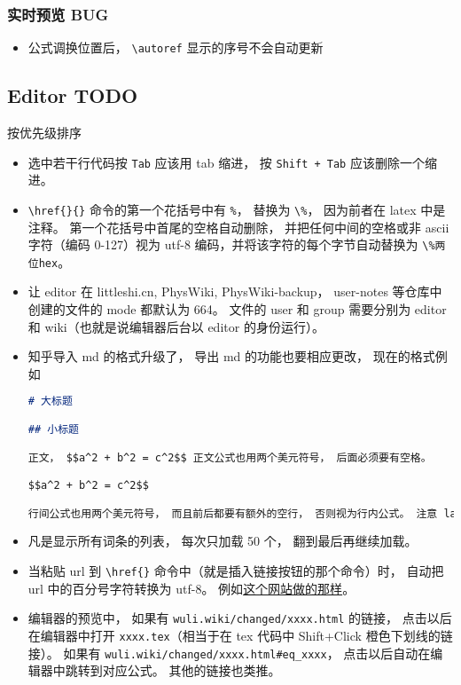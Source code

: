 \subsubsection{实时预览 BUG}
\begin{itemize}
\item 公式调换位置后， \verb|\autoref| 显示的序号不会自动更新
\end{itemize}

\subsection{Editor TODO}
按优先级排序
\begin{itemize}
\item 选中若干行代码按 \verb|Tab| 应该用 tab 缩进， 按 \verb|Shift + Tab| 应该删除一个缩进。
\item \verb|\href{}{}| 命令的第一个花括号中有 \verb|%|， 替换为 \verb|\%|， 因为前者在 latex 中是注释。 第一个花括号中首尾的空格自动删除， 并把任何中间的空格或非 ascii 字符（编码 0-127）视为 utf-8 编码，并将该字符的每个字节自动替换为 \verb|\%两位hex|。
\item 让 editor 在 littleshi.cn, PhysWiki, PhysWiki-backup， user-notes 等仓库中创建的文件的 mode 都默认为 664。 文件的 user 和 group 需要分别为 editor 和 wiki（也就是说编辑器后台以 editor 的身份运行）。
\item 知乎导入 md 的格式升级了， 导出 md 的功能也要相应更改， 现在的格式例如
\begin{lstlisting}[language=markdown]
# 大标题

## 小标题

正文， $$a^2 + b^2 = c^2$$ 正文公式也用两个美元符号， 后面必须要有空格。

$$a^2 + b^2 = c^2$$

行间公式也用两个美元符号， 而且前后都要有额外的空行， 否则视为行内公式。 注意 latex 代码还是要使用 html 中的而不是 tex 中的。
\end{lstlisting}

\item 凡是显示所有词条的列表， 每次只加载 50 个， 翻到最后再继续加载。

\item 当粘贴 url 到 \verb|\href{}| 命令中（就是插入链接按钮的那个命令）时， 自动把 url 中的百分号字符转换为 utf-8。 例如\href{https://www.webatic.com/url-convertor}{这个网站做的那样}。

\item 编辑器的预览中， 如果有 \verb|wuli.wiki/changed/xxxx.html| 的链接， 点击以后在编辑器中打开 \verb|xxxx.tex|（相当于在 tex 代码中 Shift+Click 橙色下划线的链接）。 如果有 \verb|wuli.wiki/changed/xxxx.html#eq_xxxx|， 点击以后自动在编辑器中跳转到对应公式。 其他的链接也类推。


\end{itemize}
